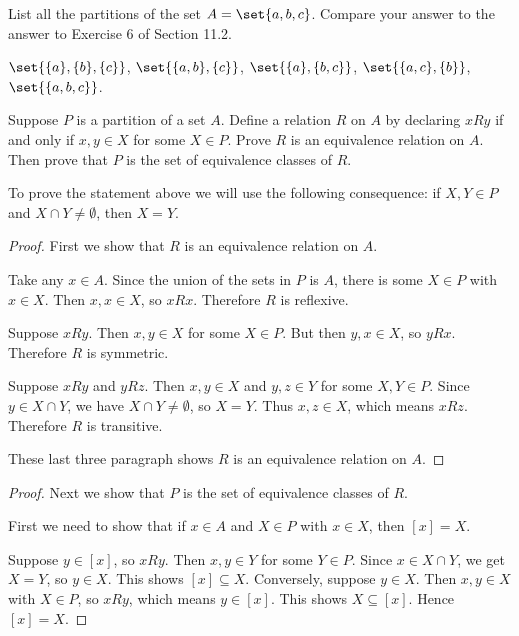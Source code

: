 \documentclass[DIN, pagenumber=false, fontsize=11pt, parskip=half]{scrartcl}
\begin{document}
\begin{problems}
    \problem List all the partitions of the set $A = \set{a,b,c}$. Compare your answer to the answer to Exercise 6 of Section 11.2.

    \answer $\set{\{a\},\{b\},\{c\}}$, $\set{\{a,b\},\{c\}}$, $\set{\{a\},\{b,c\}}$, $\set{\{a,c\},\{b\}}$, $\set{\{a,b,c\}}$.

    \problem Suppose $P$ is a partition of a set $A$. Define a relation $R$ on $A$ by declaring $xRy$ if and only if $x,y \in X$ for some $X \in P$. Prove $R$ is an equivalence relation on $A$. Then prove that $P$ is the set of equivalence classes of $R$.

    \answer To prove the statement above we will use the following consequence: if $X, Y \in P$ and $X \cap Y \neq \emptyset$, then $X = Y$.

    \begin{proof}
        First we show that $R$ is an equivalence relation on $A$.

        Take any $x \in A$.
        Since the union of the sets in $P$ is $A$, there is some $X \in P$ with $x \in X$.
        Then $x, x \in X$, so $xRx$.
        Therefore $R$ is reflexive.

        Suppose $xRy$. Then $x, y \in X$ for some $X \in P$. But then $y, x \in X$, so $yRx$. Therefore $R$ is symmetric.

        Suppose $xRy$ and $yRz$.
        Then $x, y \in X$ and $y, z \in Y$ for some $X, Y \in P$.
        Since $y \in X \cap Y$, we have $X \cap Y \neq \emptyset$, so $X = Y$. 
        Thus $x, z \in X$, which means $xRz$. Therefore $R$ is transitive.

        These last three paragraph shows $R$ is an equivalence relation on $A$.
    \end{proof}

    \begin{proof}
        Next we show that $P$ is the set of equivalence classes of $R$.

        First we need to show that if $x \in A$ and $X \in P$ with $x \in X$, then $[x] = X$.

        Suppose $y \in [x]$, so $xRy$.
        Then $x, y \in Y$ for some $Y \in P$.
        Since $x \in X \cap Y$, we get $X = Y$, so $y \in X$.
        This shows $[x] \subseteq X$.
        Conversely, suppose $y \in X$.
        Then $x, y \in X$ with $X \in P$, so $xRy$, which means $y \in [x]$.
        This shows $X \subseteq [x]$. Hence $[x] = X$.


\end{proof}
\end{problems}
\end{document}
